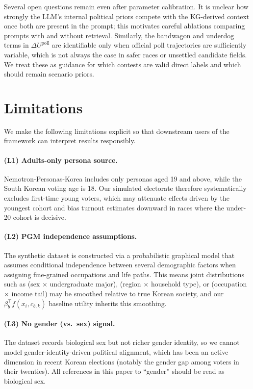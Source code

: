\documentclass[11pt]{article}
\begin{document}
Several open questions remain even after parameter calibration. It is unclear how strongly the LLM's internal political priors compete with the KG-derived context once both are present in the prompt; this motivates careful ablations comparing prompts with and without retrieval. Similarly, the bandwagon and underdog terms in $\Delta U^{\text{poll}}$ are identifiable only when official poll trajectories are sufficiently variable, which is not always the case in safer races or unsettled candidate fields. We treat these as guidance for which contests are valid direct labels and which should remain scenario priors.

\section{Limitations}
\label{sec:limitations}

We make the following limitations explicit so that downstream users of the framework can interpret results responsibly.

\paragraph{(L1) Adults-only persona source.}
Nemotron-Personas-Korea includes only personas aged 19 and above, while the South Korean voting age is 18. Our simulated electorate therefore systematically excludes first-time young voters, which may attenuate effects driven by the youngest cohort and bias turnout estimates downward in races where the under-20 cohort is decisive.

\paragraph{(L2) PGM independence assumptions.}
The synthetic dataset is constructed via a probabilistic graphical model that assumes conditional independence between several demographic factors when assigning fine-grained occupations and life paths. This means joint distributions such as (sex $\times$ undergraduate major), (region $\times$ household type), or (occupation $\times$ income tail) may be smoothed relative to true Korean society, and our $\beta_b^\top f(x_i, c_{b,k})$ baseline utility inherits this smoothing.

\paragraph{(L3) No gender (vs.\ sex) signal.}
The dataset records biological sex but not richer gender identity, so we cannot model gender-identity-driven political alignment, which has been an active dimension in recent Korean elections (notably the gender gap among voters in their twenties). All references in this paper to ``gender'' should be read as biological sex.
\end{document}
